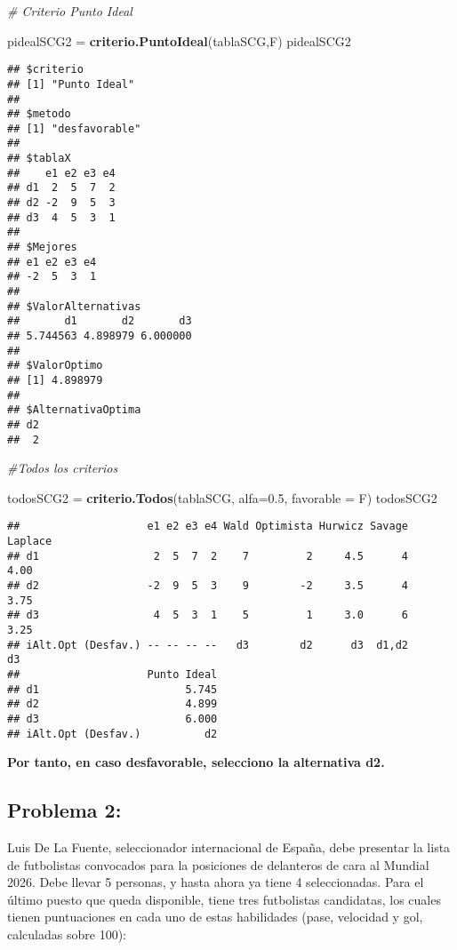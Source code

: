 \documentclass[
]{article}
\newenvironment{Shaded}{\begin{snugshade}}{\end{snugshade}}
\newcommand{\AttributeTok}[1]{\textcolor[rgb]{0.13,0.29,0.53}{#1}}
\newcommand{\CommentTok}[1]{\textcolor[rgb]{0.56,0.35,0.01}{\textit{#1}}}
\newcommand{\FloatTok}[1]{\textcolor[rgb]{0.00,0.00,0.81}{#1}}
\newcommand{\FunctionTok}[1]{\textcolor[rgb]{0.13,0.29,0.53}{\textbf{#1}}}
\newcommand{\NormalTok}[1]{#1}
\newcommand{\OtherTok}[1]{\textcolor[rgb]{0.56,0.35,0.01}{#1}}
\begin{document}
\begin{Shaded}
\begin{Highlighting}[]
\CommentTok{\# Criterio Punto Ideal}

\NormalTok{pidealSCG2 }\OtherTok{=} \FunctionTok{criterio.PuntoIdeal}\NormalTok{(tablaSCG,F)}
\NormalTok{pidealSCG2}
\end{Highlighting}
\end{Shaded}

\begin{verbatim}
## $criterio
## [1] "Punto Ideal"
## 
## $metodo
## [1] "desfavorable"
## 
## $tablaX
##    e1 e2 e3 e4
## d1  2  5  7  2
## d2 -2  9  5  3
## d3  4  5  3  1
## 
## $Mejores
## e1 e2 e3 e4 
## -2  5  3  1 
## 
## $ValorAlternativas
##       d1       d2       d3 
## 5.744563 4.898979 6.000000 
## 
## $ValorOptimo
## [1] 4.898979
## 
## $AlternativaOptima
## d2 
##  2
\end{verbatim}

\begin{Shaded}
\begin{Highlighting}[]
\CommentTok{\#Todos los criterios}

\NormalTok{todosSCG2 }\OtherTok{=} \FunctionTok{criterio.Todos}\NormalTok{(tablaSCG, }\AttributeTok{alfa=}\FloatTok{0.5}\NormalTok{, }\AttributeTok{favorable =}\NormalTok{ F)}
\NormalTok{todosSCG2}
\end{Highlighting}
\end{Shaded}

\begin{verbatim}
##                    e1 e2 e3 e4 Wald Optimista Hurwicz Savage Laplace
## d1                  2  5  7  2    7         2     4.5      4    4.00
## d2                 -2  9  5  3    9        -2     3.5      4    3.75
## d3                  4  5  3  1    5         1     3.0      6    3.25
## iAlt.Opt (Desfav.) -- -- -- --   d3        d2      d3  d1,d2      d3
##                    Punto Ideal
## d1                       5.745
## d2                       4.899
## d3                       6.000
## iAlt.Opt (Desfav.)          d2
\end{verbatim}

\textbf{Por tanto, en caso desfavorable, selecciono la alternativa d2.}

\subsection{Problema 2:}\label{problema-2-1}

Luis De La Fuente, seleccionador internacional de España, debe presentar
la lista de futbolistas convocados para la posiciones de delanteros de
cara al Mundial 2026. Debe llevar 5 personas, y hasta ahora ya tiene 4
seleccionadas. Para el último puesto que queda disponible, tiene tres
futbolistas candidatas, los cuales tienen puntuaciones en cada uno de
estas habilidades (pase, velocidad y gol, calculadas sobre 100):
\end{document}
